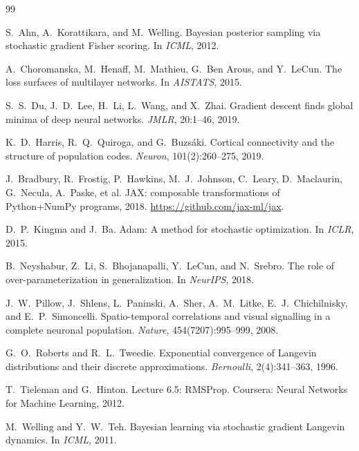 \begin{thebibliography}{99}

S.~Ahn, A.~Korattikara, and M.~Welling.
\newblock Bayesian posterior sampling via stochastic gradient Fisher scoring.
\newblock In \textit{ICML}, 2012.

A.~Choromanska, M.~Henaff, M.~Mathieu, G.~Ben Arous, and Y.~LeCun.
\newblock The loss surfaces of multilayer networks.
\newblock In \textit{AISTATS}, 2015.

S.~S.~Du, J.~D.~Lee, H.~Li, L.~Wang, and X.~Zhai.
\newblock Gradient descent finds global minima of deep neural networks.
\newblock \textit{JMLR}, 20:1--46, 2019.

K.~D.~Harris, R.~Q.~Quiroga, and G.~Buzs\'{a}ki.
\newblock Cortical connectivity and the structure of population codes.
\newblock \textit{Neuron}, 101(2):260--275, 2019.

J.~Bradbury, R.~Frostig, P.~Hawkins, M.~J.~Johnson, C.~Leary, D.~Maclaurin, G.~Necula, A.~Paske, et al.
\newblock JAX: composable transformations of Python+NumPy programs, 2018.
\newblock \url{https://github.com/jax-ml/jax}.

D.~P.~Kingma and J.~Ba.
\newblock Adam: A method for stochastic optimization.
\newblock In \textit{ICLR}, 2015.

B.~Neyshabur, Z.~Li, S.~Bhojanapalli, Y.~LeCun, and N.~Srebro.
\newblock The role of over-parameterization in generalization.
\newblock In \textit{NeurIPS}, 2018.

J.~W.~Pillow, J.~Shlens, L.~Paninski, A.~Sher, A.~M.~Litke, E.~J.~Chichilnisky, and E.~P.~Simoncelli.
\newblock Spatio-temporal correlations and visual signalling in a complete neuronal population.
\newblock \textit{Nature}, 454(7207):995--999, 2008.

G.~O.~Roberts and R.~L.~Tweedie.
\newblock Exponential convergence of Langevin distributions and their discrete approximations.
\newblock \textit{Bernoulli}, 2(4):341--363, 1996.

T.~Tieleman and G.~Hinton.
\newblock Lecture 6.5: RMSProp.
\newblock Coursera: Neural Networks for Machine Learning, 2012.

M.~Welling and Y.~W.~Teh.
\newblock Bayesian learning via stochastic gradient Langevin dynamics.
\newblock In \textit{ICML}, 2011.

\end{thebibliography}
